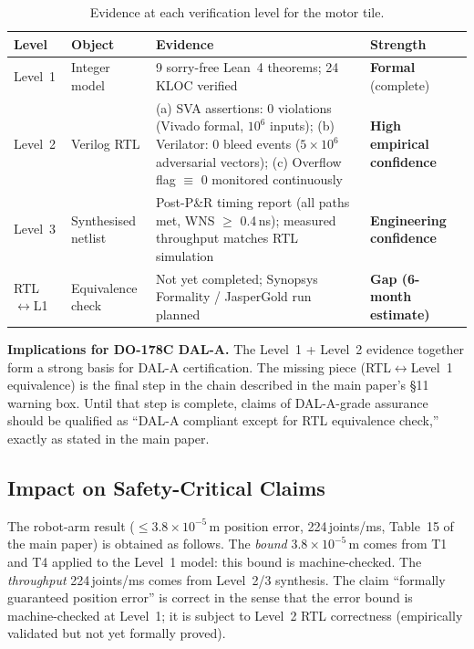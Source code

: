 \documentclass[11pt,a4paper]{article}
\theoremstyle{definition}
\theoremstyle{plain}
\theoremstyle{remark}
\begin{document}
\begin{table}[h]
\centering
\caption{Evidence at each verification level for the motor tile.}
\label{tab:evidence}
\small
\begin{tabular}{p{1.8cm}p{3.5cm}p{5cm}p{3.4cm}}
\toprule
Level & Object & Evidence & Strength \\
\midrule
Level~1 &
Integer model & 9 sorry-free Lean~4 theorems; 24\,KLOC verified &
\textbf{Formal} (complete) \\
\addlinespace
Level~2 &
Verilog RTL &
(a) SVA assertions: 0 violations (Vivado formal, $10^6$ inputs);
(b) Verilator: 0 bleed events ($5\times10^6$ adversarial vectors);
(c) Overflow flag $\equiv$ 0 monitored continuously &
\textbf{High empirical confidence} \\
\addlinespace
Level~3 &
Synthesised netlist &
Post-P\&R timing report (all paths met, WNS $\ge$ 0.4\,ns);
measured throughput matches RTL simulation &
\textbf{Engineering confidence} \\
\addlinespace
RTL$\leftrightarrow$L1 &
Equivalence check &
Not yet completed; Synopsys Formality / JasperGold run planned &
\textbf{Gap (6-month estimate)} \\
\bottomrule
\end{tabular}
\end{table}

\begin{warningbox}
\textbf{Implications for DO-178C DAL-A.}
The Level~1 + Level~2 evidence together form a strong basis for
DAL-A certification.
The missing piece (RTL$\leftrightarrow$Level~1 equivalence) is the
final step in the chain described in the main paper's \S11 warning box.
Until that step is complete, claims of DAL-A-grade assurance should be
qualified as ``DAL-A compliant except for RTL equivalence check,''
exactly as stated in the main paper.
\end{warningbox}

\subsection{Impact on Safety-Critical Claims}
\label{sec:gap3-safety}

The robot-arm result ($\le 3.8\times10^{-5}$\,m position error,
224\,joints/ms, Table~15 of the main paper) is obtained as follows.
The \emph{bound} $3.8\times10^{-5}$\,m comes from T1 and T4 applied to the
Level~1 model: this bound is machine-checked.
The \emph{throughput} 224\,joints/ms comes from Level~2/3 synthesis.
The claim ``formally guaranteed position error'' is correct in the sense
that the error bound is machine-checked at Level~1; it is subject to
Level~2 RTL correctness (empirically validated but not yet formally proved).
\end{document}
